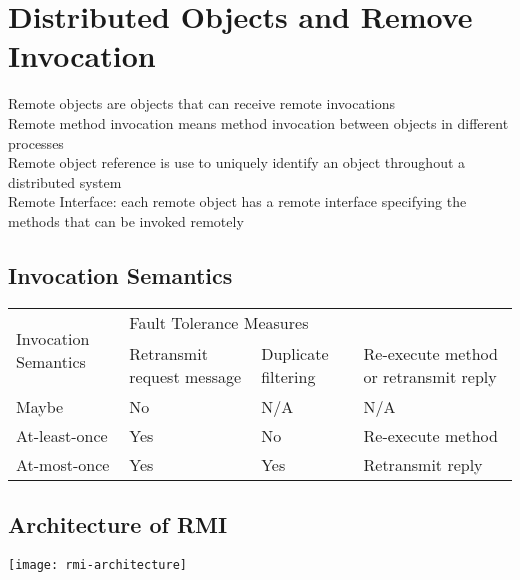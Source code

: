 \chapter{Distributed Objects and Remove Invocation}
\begin{multicols*}{2}

\noindent Remote objects are objects that can receive remote invocations\\

\noindent Remote method invocation means method invocation between objects in different processes\\

\noindent Remote object reference is use to uniquely identify an object throughout a distributed system\\

\noindent Remote Interface: each remote object has a remote interface specifying the methods that can be invoked remotely

\section{Invocation Semantics}

\scriptsize
\begin{center}
\begin{tabular}{ |m{2cm}|p{1.7cm}|p{1.7cm}|p{1.7cm}| } 
    \hline
    \multirow{2}{2cm}{\begin{center}Invocation Semantics\end{center}} & \multicolumn{3}{p{5.1cm}|}{Fault Tolerance Measures} \\ \cline{2-4}
    & Retransmit request message & Duplicate filtering & Re-execute method or retransmit reply \\
    \hline
    Maybe\newline  & No  & N/A & N/A \\
    \hline
    At-least-once  & Yes & No  & Re-execute method \\
    \hline
    At-most-once   & Yes & Yes & Retransmit reply \\
    \hline
\end{tabular}
\end{center}
\normalsize

\section{Architecture of RMI}

\begin{center}
\texttt{[image: rmi-architecture]}
\end{center}


\end{multicols*}

